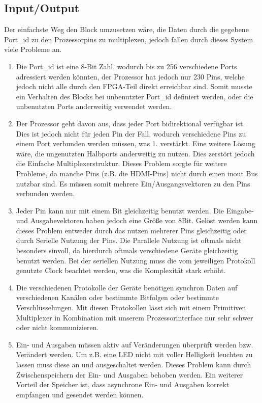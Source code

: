 \documentclass{scrartcl}
\begin{document}
\subsection{Input/Output}
Der einfachste Weg den Block umzusetzen wäre, die Daten durch die gegebene Port\_id zu den Prozessorpins zu multiplexen, jedoch fallen durch dieses System viele Probleme an.
\begin{enumerate}
    \item 
    Die Port\_id ist eine 8-Bit Zahl, wodurch bis zu 256 verschiedene Ports adressiert werden könnten, der Prozessor hat jedoch nur 230 Pins, welche jedoch nicht alle durch den FPGA-Teil direkt erreichbar sind. Somit musste ein Verhalten des Blocks bei unbenutzter Port\_id definiert werden, oder die unbenutzten Ports anderweitig verwendet werden.
    \item
    Der Prozessor geht davon aus, dass jeder Port bidirektional verfügbar ist. Dies ist jedoch nicht für jeden Pin der Fall, wodurch verschiedene Pins zu einem Port verbunden werden müssen, was 1. verstärkt. Eine weitere Lösung wäre, die ungenutzten Halbports anderweitig zu nutzen. Dies zerstört jedoch die Einfache Multiplexerstruktur. Dieses Problem sorgte für weitere Probleme, da manche Pins (z.B. die HDMI-Pins) nicht durch einen inout Bus nutzbar sind. Es müssen somit mehrere Ein/Ausgangsvektoren zu den Pins verbunden werden.
    \item
    Jeder Pin kann nur mit einem Bit gleichzeitig benutzt werden. Die Eingabe- und Ausgabevektoren haben jedoch eine Größe von 8Bit. Gelöst werden kann dieses Problem entweder durch das nutzen mehrerer Pins gleichzeitig oder durch Serielle Nutzung der Pins. Die Parallele Nutzung ist oftmals nicht besonders sinvoll, da hierdurch oftmals verschiedene Geräte gleichzeitig benutzt werden. Bei der seriellen Nutzung muss die vom jeweiligen Protokoll genutzte Clock beachtet werden, was die Komplexität stark erhöht.
    \item
    Die verschiedenen Protokolle der Geräte benötigen synchron Daten auf verschiedenen Kanälen oder bestimmte Bitfolgen oder bestimmte Verschlüsselungen. Mit diesen Protokollen lässt sich mit einem Primitiven Multiplexer in Kombination mit unserem Prozessorinterface nur sehr schwer oder nicht kommunizieren.
    \item
    Ein- und Ausgaben müssen aktiv auf Veränderungen überprüft werden bzw. Verändert werden. Um z.B. eine LED nicht mit voller Helligkeit leuchten zu lassen muss diese an und ausgeschaltet werden. Dieses Problem kann durch Zwischenspeichern der Ein- und Ausgaben behoben werden. Ein weiterer Vorteil der Speicher ist, dass asynchrone Ein- und Ausgaben korrekt empfangen und gesendet werden können.
\end{enumerate}
\end{document}
